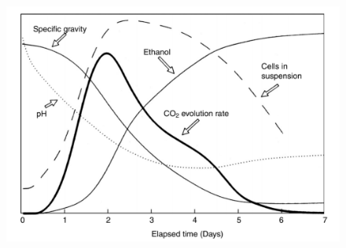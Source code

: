 \begin{figure}[H]
    \centering
    \includegraphics[scale=0.40]{figuras/contexto/variaveis_fermentacao.PNG}
    \label{fig:variaveis_fermentacao}
\end{figure}



